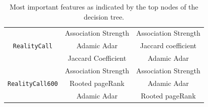 \documentclass{acm_proc_article-sp}
\begin{document}
\begin{table}
{\begin{tabular}{ c c c}
			\midrule
			\multirow{3}{*}{\texttt{RealityCall}} & Association Strength & Association Strength\\
			& Adamic Adar & Jaccard coefficient\\
			& Jaccard Coefficient & Adamic Adar\\
			\midrule
			\multirow{3}{*}{\texttt{RealityCall600}} & Association Strength & Association Strength \\
			& Rooted pageRank & Adamic Adar\\
			& Adamic Adar & Rooted pageRank\\
			\midrule
	\end{tabular}}
	\caption{Most important features as indicated by the top nodes of the decision tree.}
	\label{feature_importance}
\end{table}
	
\end{document}
